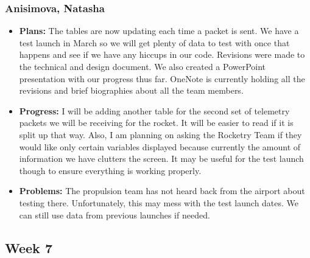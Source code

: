 \documentclass[10pt,draftclsnofoot,onecolumn]{IEEEtran}
\begin{document}
\subsubsection{Anisimova, Natasha}
\begin{itemize}
	\item \textbf{Plans: }
	The tables are now updating each time a packet is sent. We have a test launch in March so we will get plenty of data to test with once that happens and see if we have any hiccups in our code. Revisions were made to the technical and design document. We also created a PowerPoint presentation with our progress thus far. OneNote is currently holding all the revisions and brief biographies about all the team members.
	\item \textbf{Progress: }
	I will be adding another table for the second set of telemetry packets we will be receiving for the rocket. It will be easier to read if it is split up that way. Also, I am planning on asking the Rocketry Team if they would like only certain variables displayed because currently the amount of information we have clutters the screen. It may be useful for the test launch though to ensure everything is working properly.

	\item \textbf{Problems: }
	The propulsion team has not heard back from the airport about testing there. Unfortunately, this may mess with the test launch dates. We can still use data from previous launches if needed.
\end{itemize}
\subsection{Week 7}
\end{document}
